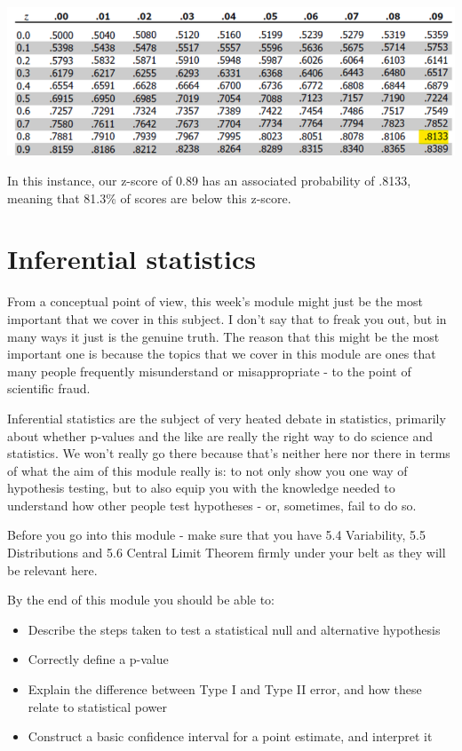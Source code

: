 \documentclass[
]{book}
\providecommand{\tightlist}{%
  \setlength{\itemsep}{0pt}\setlength{\parskip}{0pt}}
\begin{document}
\begin{center}\includegraphics{img/ztable_highlight} \end{center}

In this instance, our z-score of 0.89 has an associated probability of .8133, meaning that 81.3\% of scores are below this z-score.

\chapter{Inferential statistics}\label{inferential-statistics}

From a conceptual point of view, this week's module might just be the most important that we cover in this subject. I don't say that to freak you out, but in many ways it just is the genuine truth. The reason that this might be the most important one is because the topics that we cover in this module are ones that many people frequently misunderstand or misappropriate - to the point of scientific fraud.

Inferential statistics are the subject of very heated debate in statistics, primarily about whether p-values and the like are really the right way to do science and statistics. We won't really go there because that's neither here nor there in terms of what the aim of this module really is: to not only show you one way of hypothesis testing, but to also equip you with the knowledge needed to understand how other people test hypotheses - or, sometimes, fail to do so.

Before you go into this module - make sure that you have 5.4 Variability, 5.5 Distributions and 5.6 Central Limit Theorem firmly under your belt as they will be relevant here.

By the end of this module you should be able to:

\begin{itemize}
\tightlist
\item
  Describe the steps taken to test a statistical null and alternative hypothesis
\item
  Correctly define a p-value
\item
  Explain the difference between Type I and Type II error, and how these relate to statistical power
\item
  Construct a basic confidence interval for a point estimate, and interpret it
\end{itemize}
\end{document}

